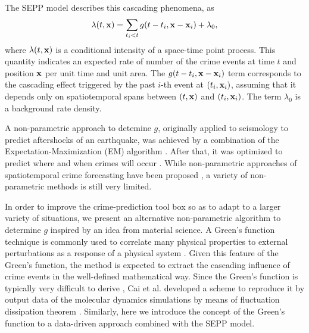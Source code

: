 \documentclass[review]{elsarticle}
\newcommand{\red}[1]{\textcolor{black}{#1}}
\newcommand{\bv}[1]{{\bf #1}}
\begin{document}
The SEPP model describes this cascading phenomena, as 
\begin{equation}
\lambda(t,\bv{x}) = \sum_{t_i<t}g(t-t_i,\bv{x}-\bv{x}_i) + \lambda_0,
\label{pointprocessmodel}
\end{equation}
where $\lambda(t,\bv{x})$ is a conditional intensity of 
a space-time point process.
This quantity indicates an expected rate of 
 number of the crime events at time $t$ and position $\bv{x}$  
  per unit time and unit area.
The $g(t-t_i,\bv{x}-\bv{x}_i)$ term corresponds to the cascading effect triggered by the past $i$-th event at $(t_i,\bv{x}_i)$, assuming that it depends only on spatiotemporal spans
between $(t,\bv{x})$ and $(t_i,\bv{x}_i)$.
The term $\lambda_0$ is a  background rate density.

A non-parametric approach to detemine $g$, originally applied to seismology to predict aftershocks of an earthquake, 
was achieved by a combination of
the Expectation-Maximization (EM) algorithm  \cite{marsan2008, marsan2010}.
After that, it was optimized to predict where and when crimes will occur    \cite{mohler}.
While non-parametric approaches of 
spatiotemporal crime forecasting
have been proposed
\cite{noiman,zhou,flaxman2015,eichler, mohler2017, flaxman2018},
a variety of non-parametric methods is still very limited.




In order to improve the crime-prediction tool box so as to adapt to a larger variety of situations,
we present an alternative non-parametric algorithm to determine $g$ 
inspired by an idea from material science.
 A Green's function technique is commonly used to correlate many physical properties  to external perturbations as a response of a physical system 
 \red{
 \cite{stanley, kajita2016, cai}
 }.
Given this feature of the Green's function,
the method is expected to extract the cascading influence of  crime events in the well-defined mathematical way.
 Since the Green's function is typically very difficult to
 derive \cite{kajita2016},
Cai et al. developed a scheme to reproduce it by output data of the molecular dynamics simulations by means of fluctuation dissipation theorem  \cite{cai}.
Similarly,  here we introduce the concept of the Green's function
to a data-driven approach combined with the SEPP model.
\end{document}
